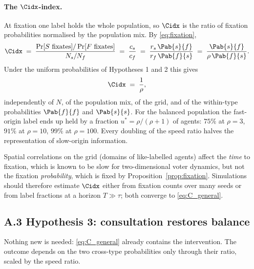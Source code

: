 \paragraph{The $\Cidx$-index.} At fixation one label holds the whole population, so $\Cidx$ is the ratio of fixation probabilities normalised by the population mix. By \eqref{eq:fixation},
\begin{equation}
\Cidx \;=\; \frac{\Pr[S \text{ fixates}] / \Pr[F \text{ fixates}]}{N_s / N_f}
\;=\; \frac{c_s}{c_f}
\;=\; \frac{r_s\, \Pab{s}{f}}{r_f\, \Pab{f}{s}}
\;=\; \frac{\Pab{s}{f}}{\rho\, \Pab{f}{s}}.
\label{eq:C_general}
\end{equation}
Under the uniform probabilities of Hypotheses 1 and 2 this gives
\begin{equation}
\Cidx \;=\; \frac{1}{\rho},
\label{eq:C_uniform}
\end{equation}
independently of $N$, of the population mix, of the grid, and of the within-type probabilities $\Pab{f}{f}$ and $\Pab{s}{s}$. For the balanced population the fast-origin label ends up held by a fraction $u^\ast = \rho/(\rho+1)$ of agents: $75\%$ at $\rho = 3$, $91\%$ at $\rho = 10$, $99\%$ at $\rho = 100$. Every doubling of the speed ratio halves the representation of slow-origin information.

\begin{remark}
Spatial correlations on the grid (domains of like-labelled agents) affect the \emph{time} to fixation, which is known to be slow for two-dimensional voter dynamics, but not the fixation \emph{probability}, which is fixed by Proposition~\ref{prop:fixation}. Simulations should therefore estimate $\Cidx$ either from fixation counts over many seeds or from label fractions at a horizon $T \gg \tau$; both converge to \eqref{eq:C_general}.
\end{remark}

\subsection*{A.3 \quad Hypothesis 3: consultation restores balance}

Nothing new is needed: \eqref{eq:C_general} already contains the intervention. The outcome depends on the two cross-type probabilities only through their ratio, scaled by the speed ratio.

